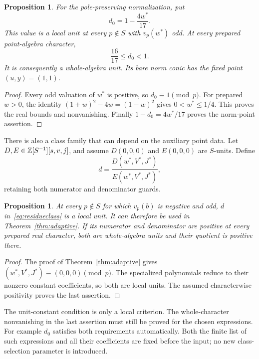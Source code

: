 \documentclass[11pt,a4paper]{article}
\newtheorem{proposition}[theorem]{Proposition}
\theoremstyle{definition}\newtheorem{definition}[theorem]{Definition}
\begin{document}
\begin{proposition}\label{prop:normalizedclass}
For the pole-preserving normalization, put
\begin{equation}\label{eq:normalizedclass}
                         d_0=1-\frac{4w^*}{17}.
\end{equation}
This value is a local unit at every $p\notin S$ with $v_p(w^*)$
odd. At every prepared point-algebra character,
\[
                    \frac{16}{17}\le d_0<1.
\]
It is consequently a whole-algebra unit. Its bare norm conic has
the fixed point $(u,y)=(1,1)$.
\end{proposition}
\begin{proof}
Every odd valuation of $w^*$ is positive, so $d_0\equiv1\pmod p$.
For prepared $w>0$, the identity $(1+w)^2-4w=(1-w)^2$ gives
$0<w^*\le1/4$. This proves the real bounds and nonvanishing.
Finally $1-d_0=4w^*/17$ proves the norm-point assertion.
\end{proof}

There is also a class family that can depend on the auxiliary
point data. Let $D,E\in\mathbb Z[S^{-1}][s,v,j]$, and assume
$D(0,0,0)$ and $E(0,0,0)$ are $S$-units. Define
\begin{equation}\label{eq:residueclass}
          d=\frac{D(w^*,V^*,J^*)}{E(w^*,V^*,J^*)},
\end{equation}
retaining both numerator and denominator guards.

\begin{proposition}\label{prop:residueclass}
At every $p\notin S$ for which $v_p(b)$ is negative and odd,
$d$ in~\eqref{eq:residueclass} is a local unit. It can therefore
be used in Theorem~\ref{thm:adaptive}. If its numerator and
denominator are positive at every prepared real character, both
are whole-algebra units and their quotient is positive there.
\end{proposition}
\begin{proof}
The proof of Theorem~\ref{thm:adaptive} gives
$(w^*,V^*,J^*)\equiv(0,0,0)\pmod p$. The specialized
polynomials reduce to their nonzero constant coefficients, so both
are local units. The assumed characterwise positivity proves the
last assertion.
\end{proof}

The unit-constant condition is only a local criterion. The
whole-character nonvanishing in the last assertion must still be
proved for the chosen expressions. For example $d_0$ satisfies
both requirements automatically. Both the finite list of such
expressions and all their coefficients are fixed before the input;
no new class-selection parameter is introduced.
\end{document}

